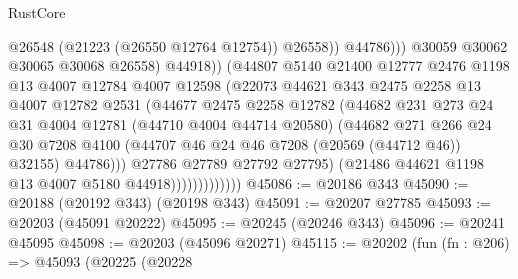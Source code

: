 \begin{lexlean}{RustCore}
\begin{coremodule}
                                          @26548
                                          (@21223 (@26550 @12764 @12754))
                                          @26558))
                                      @44786)))
                                @30059
                                @30062
                                @30065
                                @30068
                                @26558)
                              @44918))
                          (@44807
                            @5140
                            @21400
                            @12777
                            @2476
                            @1198
                            @13
                            @4007
                            @12784
                            @4007
                            @12598
                            (@22073
                              @44621
                              @343
                              @2475
                              @2258
                              @13
                              @4007
                              @12782
                              @2531
                              (@44677
                                @2475
                                @2258
                                @12782
                                (@44682
                                  @231
                                  @273
                                  @24
                                  @31
                                  @4004
                                  @12781
                                  (@44710 @4004 @44714 @20580)
                                  (@44682
                                    @271
                                    @266
                                    @24
                                    @30
                                    @7208
                                    @4100
                                    (@44707 @46 @24 @46 @7208 (@20569 (@44712 @46)) @32155)
                                    @44786)))
                              @27786
                              @27789
                              @27792
                              @27795)
                            (@21486 @44621 @1198 @13 @4007 @5180 @44918)))))))))))))
@45086 := @20186 @343
@45090 := @20188 (@20192 @343) (@20198 @343)
@45091 := @20207 @27785
@45093 := @20203 (@45091 @20222)
@45095 := @20245 (@20246 @343)
@45096 := @20241 @45095
@45098 := @20203 (@45096 @20271)
@45115 := @20202
    (fun (fn : @206) =>
    @45093
      (@20225
        (@20228

\end{coremodule}
\end{lexlean}
